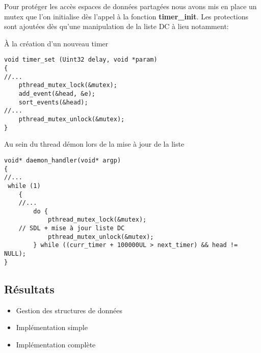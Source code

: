 \documentclass[a4paper]{article}
\newcommand{\cmark}{\ding{51}}%
\newcommand{\xmark}{\ding{55}}%
\newcommand{\done}{\rlap{$\square$}{\raisebox{2pt}{\large\hspace{1pt}\cmark}}%
\hspace{-2.5pt}}
\newcommand{\wontfix}{\rlap{$\square$}{\large\hspace{1pt}\xmark}}
\begin{document}
Pour protéger les accès espaces de données partagées nous avons mis en place un mutex que l'on initialise dès l'appel à la fonction \textbf{timer\_init}. Les protections sont ajoutées dès qu'une manipulation de la liste DC à lieu notamment:

À la création d'un nouveau timer
\begin{verbatim}
void timer_set (Uint32 delay, void *param)
{
//...
    pthread_mutex_lock(&mutex);
    add_event(&head, &e);
    sort_events(&head);
//...
    pthread_mutex_unlock(&mutex);
}
\end{verbatim}

Au sein du thread démon lors de la mise à jour de la liste
\begin{verbatim}
void* daemon_handler(void* argp)
{
//...
 while (1)
    {
	//...
        do {
            pthread_mutex_lock(&mutex);
	// SDL + mise à jour liste DC
            pthread_mutex_unlock(&mutex);
        } while ((curr_timer + 100000UL > next_timer) && head != NULL);
}
\end{verbatim}

\subsection{Résultats}

\begin{itemize}
  \item Gestion des structures de données
  
  \item Implémentation simple
  
  \item Implémentation complète
\end{itemize}
\end{document}
